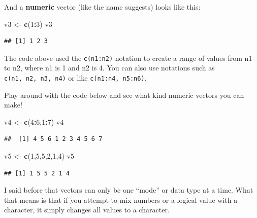 \documentclass[
]{book}
\newenvironment{Shaded}{\begin{snugshade}}{\end{snugshade}}
\newcommand{\DecValTok}[1]{\textcolor[rgb]{0.00,0.00,0.81}{#1}}
\newcommand{\KeywordTok}[1]{\textcolor[rgb]{0.13,0.29,0.53}{\textbf{#1}}}
\newcommand{\NormalTok}[1]{#1}
\newcommand{\OperatorTok}[1]{\textcolor[rgb]{0.81,0.36,0.00}{\textbf{#1}}}
\newcommand{\StringTok}[1]{\textcolor[rgb]{0.31,0.60,0.02}{#1}}
\begin{document}
And a \textbf{numeric} vector (like the name suggests) looks like this:

\begin{Shaded}
\begin{Highlighting}[]
\NormalTok{v3 <-}\StringTok{ }\KeywordTok{c}\NormalTok{(}\DecValTok{1}\OperatorTok{:}\DecValTok{3}\NormalTok{)}
\NormalTok{v3}
\end{Highlighting}
\end{Shaded}

\begin{verbatim}
## [1] 1 2 3
\end{verbatim}

The code above used the \texttt{c(n1:n2)} notation to create a range of values from n1 to n2, where n1 is 1 and n2 is 4. You can also use notations such as \texttt{c(n1,\ n2,\ n3,\ n4)} or like \texttt{c(n1:n4,\ n5:n6)}.

Play around with the code below and see what kind numeric vectors you can make!

\begin{Shaded}
\begin{Highlighting}[]
\NormalTok{v4 <-}\StringTok{ }\KeywordTok{c}\NormalTok{(}\DecValTok{4}\OperatorTok{:}\DecValTok{6}\NormalTok{,}\DecValTok{1}\OperatorTok{:}\DecValTok{7}\NormalTok{)}
\NormalTok{v4}
\end{Highlighting}
\end{Shaded}

\begin{verbatim}
##  [1] 4 5 6 1 2 3 4 5 6 7
\end{verbatim}

\begin{Shaded}
\begin{Highlighting}[]
\NormalTok{v5 <-}\StringTok{ }\KeywordTok{c}\NormalTok{(}\DecValTok{1}\NormalTok{,}\DecValTok{5}\NormalTok{,}\DecValTok{5}\NormalTok{,}\DecValTok{2}\NormalTok{,}\DecValTok{1}\NormalTok{,}\DecValTok{4}\NormalTok{)}
\NormalTok{v5}
\end{Highlighting}
\end{Shaded}

\begin{verbatim}
## [1] 1 5 5 2 1 4
\end{verbatim}

I said before that vectors can only be one ``mode'' or data type at a time. What that means is that if you attempt to mix numbers or a logical value with a character, it simply changes all values to a character.
\end{document}
